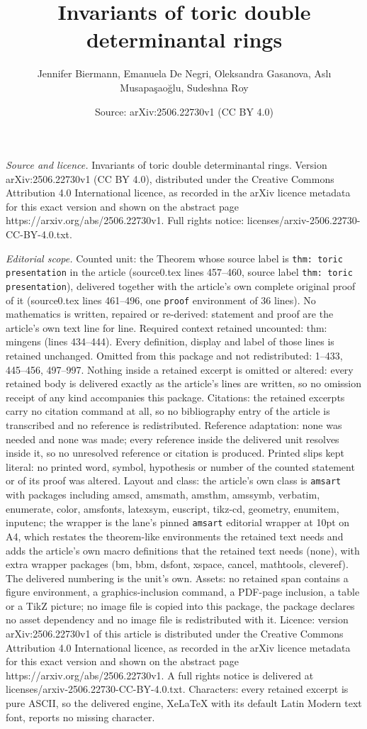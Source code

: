 \documentclass[10pt,a4paper]{amsart}
\title[Invariants of toric double determinantal rings]{Invariants of toric double determinantal rings}
\author{Jennifer Biermann, Emanuela De Negri, Oleksandra Gasanova, Asl{\i} Musapa\c{s}ao\u{g}lu, Sudeshna Roy}
\date{Source: arXiv:2506.22730v1 (CC BY 4.0)}
\begin{document}
\maketitle

\noindent\emph{Source and licence.} Invariants of toric double determinantal rings. Version arXiv:2506.22730v1 (CC BY 4.0), distributed under the Creative Commons Attribution 4.0 International licence, as recorded in the arXiv licence metadata for this exact version and shown on the abstract page https://arxiv.org/abs/2506.22730v1. Full rights notice: licenses/arxiv-2506.22730-CC-BY-4.0.txt.\par\smallskip

\noindent\textit{Editorial scope.} Counted unit: the Theorem whose source label is \texttt{thm: toric presentation} in the article (source0.tex lines 457--460, source label \texttt{thm: toric presentation}), delivered together with the article's own complete original proof of it (source0.tex lines 461--496, one \texttt{proof} environment of 36 lines). No mathematics is written, repaired or re-derived: statement and proof are the article's own text line for line. Required context retained uncounted: thm: mingens (lines 434--444). Every definition, display and label of those lines is retained unchanged. Omitted from this package and not redistributed: 1--433, 445--456, 497--997. Nothing inside a retained excerpt is omitted or altered: every retained body is delivered exactly as the article's lines are written, so no omission receipt of any kind accompanies this package. Citations: the retained excerpts carry no citation command at all, so no bibliography entry of the article is transcribed and no reference is redistributed. Reference adaptation: none was needed and none was made; every reference inside the delivered unit resolves inside it, so no unresolved reference or citation is produced. Printed slips kept literal: no printed word, symbol, hypothesis or number of the counted statement or of its proof was altered. Layout and class: the article's own class is \texttt{amsart} with packages including amscd, amsmath, amsthm, amssymb, verbatim, enumerate, color, amsfonts, latexsym, euscript, tikz-cd, geometry, enumitem, inputenc; the wrapper is the lane's pinned \texttt{amsart} editorial wrapper at 10pt on A4, which restates the theorem-like environments the retained text needs and adds the article's own macro definitions that the retained text needs (none), with extra wrapper packages (bm, bbm, dsfont, xspace, cancel, mathtools, cleveref). The delivered numbering is the unit's own. Assets: no retained span contains a figure environment, a graphics-inclusion command, a PDF-page inclusion, a table or a TikZ picture; no image file is copied into this package, the package declares no asset dependency and no image file is redistributed with it. Licence: version arXiv:2506.22730v1 of this article is distributed under the Creative Commons Attribution 4.0 International licence, as recorded in the arXiv licence metadata for this exact version and shown on the abstract page https://arxiv.org/abs/2506.22730v1. A full rights notice is delivered at licenses/arxiv-2506.22730-CC-BY-4.0.txt. Characters: every retained excerpt is pure ASCII, so the delivered engine, XeLaTeX with its default Latin Modern text font, reports no missing character.
\end{document}
